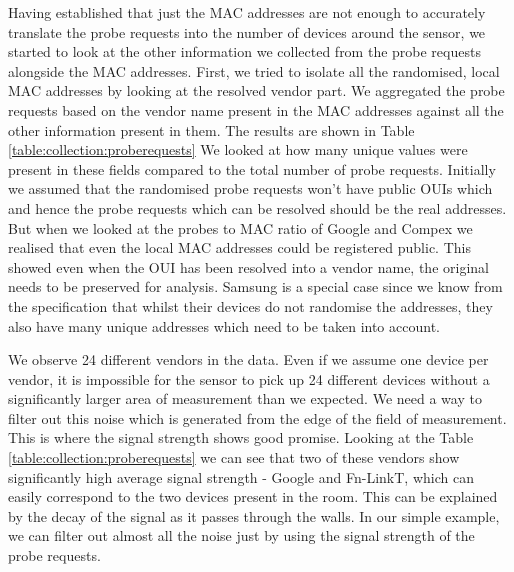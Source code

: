 Having established that just the MAC addresses are not enough to accurately translate the probe requests into the number of devices around the sensor, we started to look at the other information we collected from the probe requests alongside the MAC addresses.
First, we tried to isolate all the randomised, local MAC addresses by looking at the resolved vendor part.
We aggregated the probe requests based on the vendor name present in the MAC addresses against all the other information present in them.
The results are shown in Table \ref{table:collection:proberequests}
We looked at how many unique values were present in these fields compared to the total number of probe requests. 
Initially we assumed that the randomised probe requests won't have public OUIs which and hence the probe requests which can be resolved should be the real addresses.
But when we looked at the probes to MAC ratio of Google and Compex we realised that even the local MAC addresses could be registered public. 
This showed even when the OUI has been resolved into a vendor name, the original needs to be preserved for analysis.
Samsung is a special case since we know from the specification that whilst their devices do not randomise the addresses, they also have many unique addresses which need to be taken into account.

We observe 24 different vendors in the data. Even if we assume one device per vendor, it is impossible for the sensor to pick up 24 different devices without a significantly larger area of measurement than we expected.
We need a way to filter out this noise which is generated from the edge of the field of measurement.
This is where the signal strength shows good promise.
Looking at the Table \ref{table:collection:proberequests} we can see that two of these vendors show significantly high average signal strength - Google and Fn-LinkT, which can easily correspond to the two devices present in the room.
This can be explained by the decay of the signal as it passes through the walls.
In our simple example, we can filter out almost all the noise just by using the signal strength of the probe requests.

